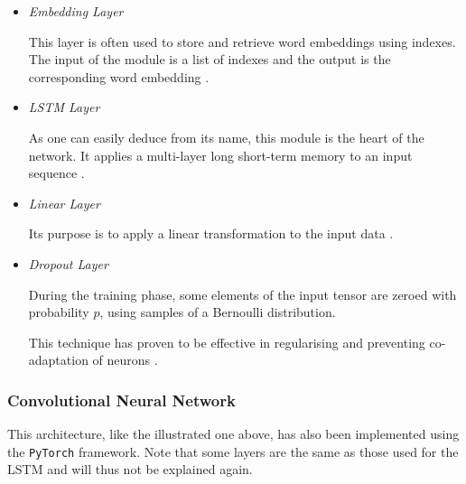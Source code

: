 \documentclass[letterpaper,11pt]{article}
\begin{document}
\begin{itemize}
  \item \textit{Embedding Layer}
  
  This layer is often used to store and retrieve word embeddings using indexes. The input of the module is a list of indexes and the output is the corresponding word embedding \cite{pytorch_embedding}.
  \item \textit{LSTM Layer}
  
  As one can easily deduce from its name, this module is the heart of the network. It applies a multi-layer long short-term memory to an input sequence \cite{pytorch_lstm}.
  \item \textit{Linear Layer}
  
  Its purpose is to apply a linear transformation to the input data \cite{pytorch_linear}.
  \item \textit{Dropout Layer}
  
  During the training phase, some elements of the input tensor are zeroed with probability $p$, using samples of a Bernoulli distribution.

  This technique has proven to be effective in regularising and preventing co-adaptation of neurons \cite{pytorch_dropout}.
\end{itemize}



\subsubsection*{Convolutional Neural Network}

This architecture, like the illustrated one above, has also been implemented using the \verb|PyTorch| framework. Note that some layers are the same as those used for the LSTM and will thus not be explained again.
\end{document}
